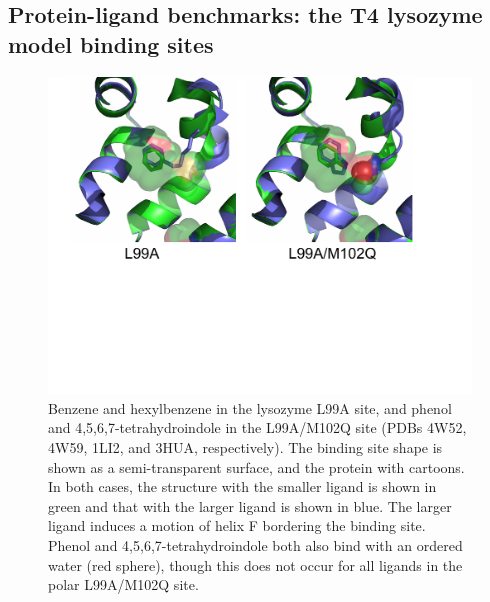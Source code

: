\documentclass[aps,pre,twocolumn,nofootinbib,superscriptaddress,10pt, final,tightenlines]{revtex4-1}
\begin{document}
\subsection{Protein-ligand benchmarks: the T4 lysozyme model binding sites}
\label{sec:t4}
\begin{figure}
\includegraphics[width=\textwidth]{figures/lysozyme.pdf}
\caption{\label{fig:lysozyme} 
Benzene and hexylbenzene in the lysozyme L99A site, and phenol and 4,5,6,7-tetrahydroindole in the L99A/M102Q site (PDBs 4W52, 4W59, 1LI2, and 3HUA, respectively).
The binding site shape is shown as a semi-transparent surface, and the protein with cartoons.
In both cases, the structure with the smaller ligand is shown in green and that with the larger ligand is shown in blue.
The larger ligand induces a motion of helix F bordering the binding site.
Phenol and 4,5,6,7-tetrahydroindole both also bind with an ordered water (red sphere), though this does not occur for all ligands in the polar L99A/M102Q site.
}
\end{figure}
\end{document}
